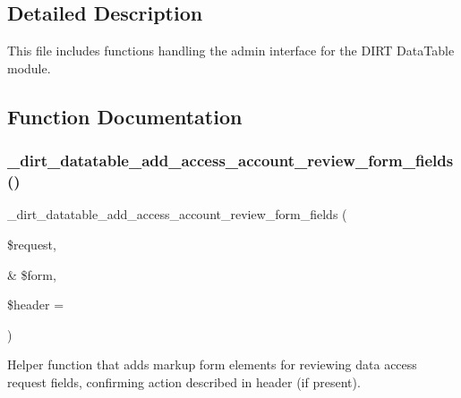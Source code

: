 \subsection{Detailed Description}
This file includes functions handling the admin interface for the D\+I\+RT Data\+Table module. 

\subsection{Function Documentation}
\mbox{\label{dirt__datatable_8admin_8inc_a3ebabb9444657ec24114a1acab7a9210}} 
\subsubsection{\texorpdfstring{\+\_\+dirt\+\_\+datatable\+\_\+add\+\_\+access\+\_\+account\+\_\+review\+\_\+form\+\_\+fields()}{\_dirt\_datatable\_add\_access\_account\_review\_form\_fields()}}
{\footnotesize\ttfamily \+\_\+dirt\+\_\+datatable\+\_\+add\+\_\+access\+\_\+account\+\_\+review\+\_\+form\+\_\+fields (\begin{DoxyParamCaption}\item[{}]{\$request,  }\item[{\&}]{\$form,  }\item[{}]{\$header = {\ttfamily \textquotesingle{}\textquotesingle{}} }\end{DoxyParamCaption})}

Helper function that adds markup form elements for reviewing data access request fields, confirming action described in header (if present).


